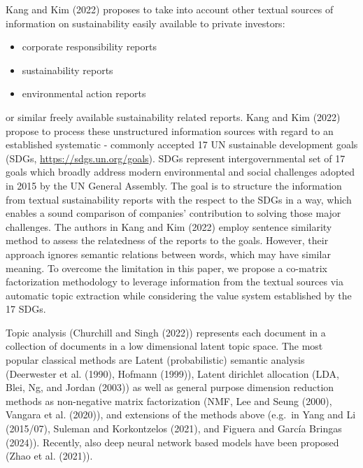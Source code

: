 \documentclass[
]{article}
\begin{document}
Kang and Kim (2022) proposes to take into account other textual sources of information on sustainability easily available to private investors:

\begin{itemize}
\item
  corporate responsibility reports
\item
  sustainability reports
\item
  environmental action reports
\end{itemize}

or similar freely available sustainability related reports. Kang and Kim (2022) propose to process these unstructured information sources with regard to an established systematic - commonly accepted 17 UN sustainable development goals (SDGs, \url{https://sdgs.un.org/goals}). SDGs represent intergovernmental set of 17 goals which broadly address modern environmental and social challenges adopted in 2015 by the UN General Assembly. The goal is to structure the information from textual sustainability reports with the respect to the SDGs in a way, which enables a sound comparison of companies' contribution to solving those major challenges. The authors in Kang and Kim (2022) employ sentence similarity method to assess the relatedness of the reports to the goals. However, their approach ignores semantic relations between words, which may have similar meaning. To overcome the limitation in this paper, we propose a co-matrix factorization methodology to leverage information from the textual sources via automatic topic extraction while considering the value system established by the 17 SDGs.

Topic analysis (Churchill and Singh (2022)) represents each document in a collection of documents in a low dimensional latent topic space. The most popular classical methods are Latent (probabilistic) semantic analysis (Deerwester et al. (1990), Hofmann (1999)), Latent dirichlet allocation (LDA, Blei, Ng, and Jordan (2003)) as well as general purpose dimension reduction methods as non-negative matrix factorization (NMF, Lee and Seung (2000), Vangara et al. (2020)), and extensions of the methods above (e.g.~in Yang and Li (2015/07), Suleman and Korkontzelos (2021), and Figuera and García Bringas (2024)). Recently, also deep neural network based models have been proposed (Zhao et al. (2021)).
\end{document}
